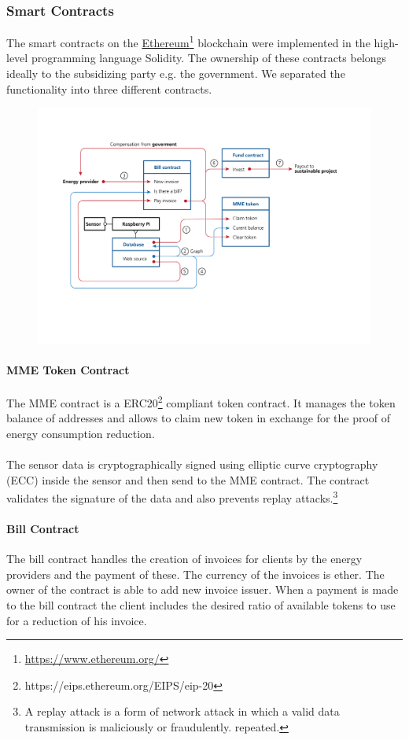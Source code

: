 \documentclass[11pt]{article}
\begin{document}
\subsubsection{Smart Contracts}
The smart contracts on the \hyperref[https://www.ethereum.org/]{Ethereum}\footnote{\href{https://www.ethereum.org/}{https://www.ethereum.org/}} blockchain were implemented in the high-level programming language Solidity. The ownership of these contracts belongs ideally to the subsidizing party e.g. the government. 
We separated the functionality into three different contracts.
\begin{figure}[h]
	\centering
	\includegraphics[width=1\linewidth]{implementation.png}
\end{figure}

\paragraph{MME Token Contract}
The MME contract is a ERC20\footnote{https://eips.ethereum.org/EIPS/eip-20} compliant token contract. It manages the token balance of addresses and allows to claim new token in exchange for the proof of energy consumption reduction. \\\\

The sensor data is cryptographically signed using elliptic curve cryptography (ECC)\cite{24} inside the sensor and then send to the MME contract. The contract validates the signature of the data and also prevents replay attacks.\footnote{A replay attack is a form of network attack in which a valid data transmission is maliciously or fraudulently. repeated.}
\paragraph{Bill Contract}
The bill contract handles the creation of invoices for clients by the energy providers and the payment of these. The currency of the invoices is ether. The owner of the contract is able to add new invoice issuer. When a payment is made to the bill contract the client includes the desired ratio of available tokens to use for a reduction of his invoice.  
\end{document}
